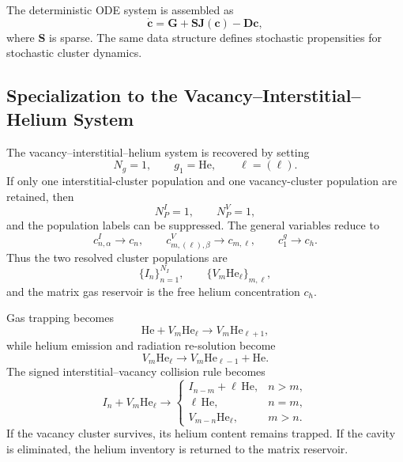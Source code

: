 The deterministic ODE system is assembled as
\begin{equation}
    \dot{\mathbf{c}}
    =
    \mathbf{G}
    +
    \mathbf{S}\mathbf{J}(\mathbf{c})
    -
    \mathbf{D}\mathbf{c},
    \label{eq:assembled_ode_system}
\end{equation}
where $\mathbf{S}$ is sparse. The same data structure defines stochastic
propensities for stochastic cluster dynamics.

\subsection{Specialization to the Vacancy--Interstitial--Helium System}
\label{sec:specialization_V_I_He}

The vacancy--interstitial--helium system is recovered by setting
\begin{equation}
    N_g=1,
    \qquad
    g_1=\mathrm{He},
    \qquad
    \boldsymbol{\ell}=(\ell).
\end{equation}
If only one interstitial-cluster population and one vacancy-cluster population
are retained, then
\begin{equation}
    N_P^I=1,
    \qquad
    N_P^V=1,
\end{equation}
and the population labels can be suppressed. The general variables reduce to
\begin{equation}
    c^I_{n,\alpha}\rightarrow c_n,
    \qquad
    c^V_{m,(\ell),\beta}\rightarrow c_{m,\ell},
    \qquad
    c^g_1\rightarrow c_h .
    \label{eq:VIHe_variable_reduction}
\end{equation}
Thus the two resolved cluster populations are
\begin{equation}
    \{I_n\}_{n=1}^{N_I},
    \qquad
    \{V_m\mathrm{He}_{\ell}\}_{m,\ell},
\end{equation}
and the matrix gas reservoir is the free helium concentration $c_h$.

Gas trapping becomes
\begin{equation}
    \mathrm{He}
    +
    V_m\mathrm{He}_{\ell}
    \longrightarrow
    V_m\mathrm{He}_{\ell+1},
\end{equation}
while helium emission and radiation re-solution become
\begin{equation}
    V_m\mathrm{He}_{\ell}
    \longrightarrow
    V_m\mathrm{He}_{\ell-1}
    +
    \mathrm{He} .
\end{equation}
The signed interstitial--vacancy collision rule becomes
\begin{equation}
    I_n + V_m\mathrm{He}_{\ell}
    \longrightarrow
    \begin{cases}
    I_{n-m}+\ell\,\mathrm{He}, & n>m, \\[4pt]
    \ell\,\mathrm{He}, & n=m, \\[4pt]
    V_{m-n}\mathrm{He}_{\ell}, & m>n .
    \end{cases}
    \label{eq:VIHe_signed_collision}
\end{equation}
If the vacancy cluster survives, its helium content remains trapped. If the
cavity is eliminated, the helium inventory is returned to the matrix reservoir.

